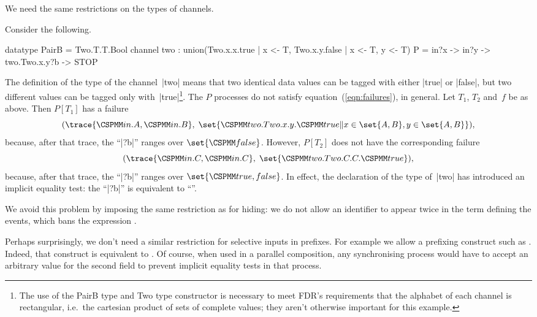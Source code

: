 We need the same restrictions on the types of channels.  
%
\begin{example}
Consider the following.
\begin{cspm}
datatype PairB = Two.T.T.Bool
channel two : union({Two.x.x.true | x <- T}, {Two.x.y.false | x <- T, y <- T})
P = in?x -> in?y -> two.Two.x.y?b -> STOP
\end{cspm}
%
The definition of the type of the channel~|two| means that two identical data
values can be tagged with either |true| or |false|, but two different values
can be tagged only with~|true|\footnote{The use of the {\cspmfont PairB} type
  and {\cspmfont Two} type constructor is necessary to meet FDR's requirements
  that the alphabet of each channel is rectangular, i.e.~the cartesian product
  of sets of complete values; they aren't otherwise important for this
  example.}.  
%
The $P$ processes do not satisfy equation~(\ref{eqn:failures}), in general.
Let $T_1$, $T_2$ and~$f$ be as above.  Then $P[T_1]$ has a failure
\[
(\trace{\M{in}.A, \M{in}.B},\; 
  \set{\M{two.Two}.x.y.\M{true} \| x \in \set{A,B}, y \in \set{A,B}}),
\]
because, after that trace, the ``|?b|'' ranges over $\set{\M{false}}$.  
However,  $P[T_2]$ does not have the corresponding failure
\[
(\trace{\M{in}.C, \M{in}.C},\; \set{\M{two.Two}.C.C.\M{true}}),
\]
because, after that trace, the ``|?b|'' ranges over $\set{\M{true,false}}$.
In effect, the declaration of the type of~|two| has introduced an implicit
equality test: the ``|?b|'' is equivalent to ``''.
\end{example}


We avoid this problem by imposing the same restriction as for hiding: we do
not allow an identifier to appear twice in the term defining the events, which
bans the expression .


Perhaps surprisingly, we don't need a similar restriction for selective inputs
in prefixes.  For example we allow a prefixing construct such
as .  Indeed, that construct is equivalent
to .  Of course, when used in a parallel composition, any
synchronising process would have to accept an arbitrary value for the second
field to prevent implicit equality tests in that process.


